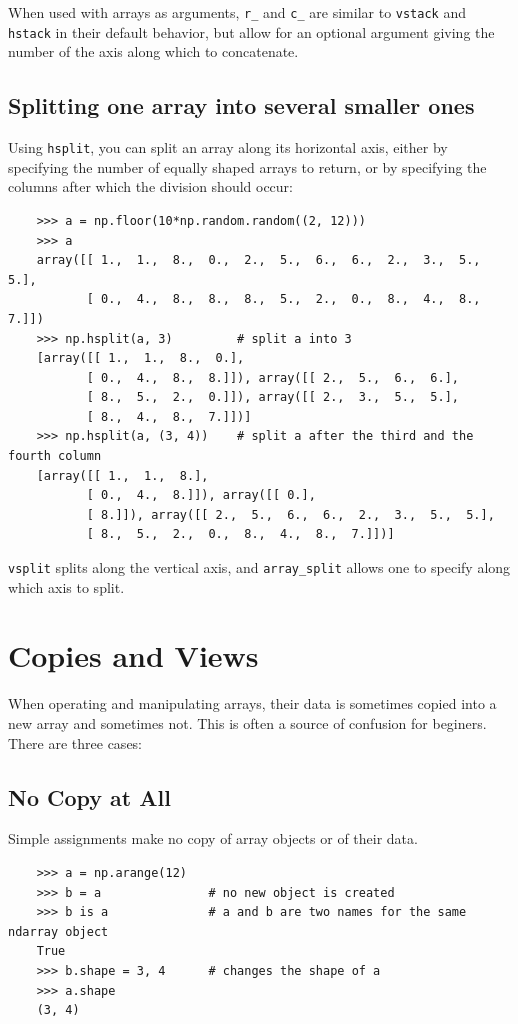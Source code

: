 \documentclass[UTF8]{article}
\begin{document}
When used with arrays as arguments, \texttt{r\_} and \texttt{c\_} are similar to \texttt{vstack}
and \texttt{hstack} in their default behavior, but allow for an optional argument giving the number
of the axis along which to concatenate.

\subsection{Splitting one array into several smaller ones}
Using \texttt{hsplit}, you can split an array along its horizontal axis, either by specifying the
number of equally shaped arrays to return, or by specifying the columns after which the division
should occur:
\begin{verbatim}
    >>> a = np.floor(10*np.random.random((2, 12)))
    >>> a
    array([[ 1.,  1.,  8.,  0.,  2.,  5.,  6.,  6.,  2.,  3.,  5.,  5.],
           [ 0.,  4.,  8.,  8.,  8.,  5.,  2.,  0.,  8.,  4.,  8.,  7.]])
    >>> np.hsplit(a, 3)         # split a into 3
    [array([[ 1.,  1.,  8.,  0.],
           [ 0.,  4.,  8.,  8.]]), array([[ 2.,  5.,  6.,  6.],
           [ 8.,  5.,  2.,  0.]]), array([[ 2.,  3.,  5.,  5.],
           [ 8.,  4.,  8.,  7.]])]
    >>> np.hsplit(a, (3, 4))    # split a after the third and the fourth column
    [array([[ 1.,  1.,  8.],
           [ 0.,  4.,  8.]]), array([[ 0.],
           [ 8.]]), array([[ 2.,  5.,  6.,  6.,  2.,  3.,  5.,  5.],
           [ 8.,  5.,  2.,  0.,  8.,  4.,  8.,  7.]])]
\end{verbatim}

\texttt{vsplit} splits along the vertical axis, and \texttt{array\_split} allows one to specify
along which axis to split.

\section{Copies and Views}
When operating and manipulating arrays, their data is sometimes copied into a new array and
sometimes not. This is often a source of confusion for beginers. There are three cases:

\subsection{No Copy at All}
Simple assignments make no copy of array objects or of their data.
\begin{verbatim}
    >>> a = np.arange(12)
    >>> b = a               # no new object is created
    >>> b is a              # a and b are two names for the same ndarray object
    True
    >>> b.shape = 3, 4      # changes the shape of a
    >>> a.shape
    (3, 4)
\end{verbatim}
\end{document}
